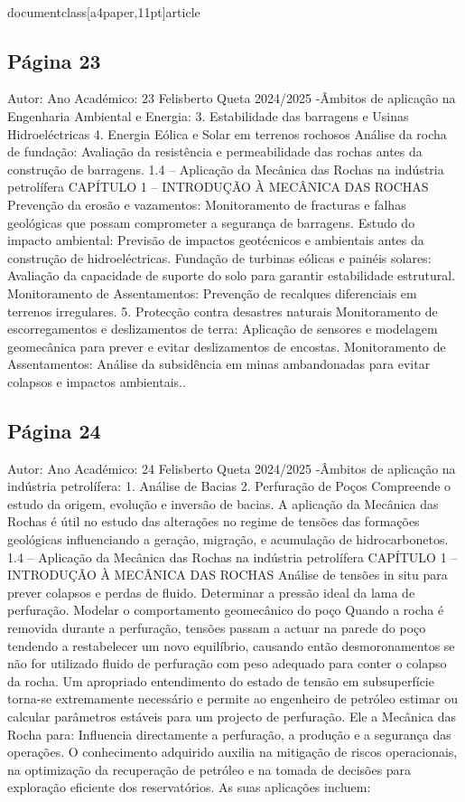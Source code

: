 \\documentclass[a4paper,11pt]{article}
\begin{document}
\subsection*{Página 23}
Autor:
Ano Académico:
23
Felisberto Queta
2024/2025
-Âmbitos de aplicação na Engenharia Ambiental e Energia:
3. Estabilidade das barragens e Usinas Hidroeléctricas
4. Energia Eólica e Solar em terrenos rochosos
Análise da rocha de fundação:
Avaliação da resistência e permeabilidade das rochas antes da construção de barragens.
1.4 – Aplicação da Mecânica das Rochas na indústria petrolífera
CAPÍTULO 1 – INTRODUÇÃO À MECÂNICA DAS ROCHAS
Prevenção da erosão e vazamentos:
Monitoramento de fracturas e falhas geológicas que possam comprometer a segurança de barragens.
Estudo do impacto ambiental:
Previsão de impactos geotécnicos e ambientais antes da construção de hidroeléctricas.
Fundação de turbinas eólicas e painéis solares:
Avaliação da capacidade de suporte do solo para garantir estabilidade estrutural.
Monitoramento de Assentamentos:
Prevenção de recalques diferenciais em terrenos irregulares.
5. Protecção contra desastres naturais
Monitoramento de escorregamentos e deslizamentos de terra:
Aplicação de sensores e modelagem geomecânica para prever e evitar deslizamentos de encostas.
Monitoramento de Assentamentos:
Análise da subsidência em minas ambandonadas para evitar colapsos e impactos ambientais..



\subsection*{Página 24}
Autor:
Ano Académico:
24
Felisberto Queta
2024/2025
-Âmbitos de aplicação na indústria petrolífera:
1. Análise de Bacias
2. Perfuração de Poços
Compreende o estudo da origem, evolução e inversão de bacias. A aplicação da Mecânica das Rochas é útil no estudo das
alterações no regime de tensões das formações geológicas influenciando a geração, migração, e acumulação de
hidrocarbonetos.
1.4 – Aplicação da Mecânica das Rochas na indústria petrolífera
CAPÍTULO 1 – INTRODUÇÃO À MECÂNICA DAS ROCHAS
Análise de tensões in situ para prever colapsos e perdas de fluido.
Determinar a pressão ideal da lama de perfuração.
Modelar o comportamento geomecânico do poço
Quando a rocha é removida durante a perfuração, tensões passam a actuar na parede do poço tendendo a restabelecer um 
novo equilíbrio, causando então desmoronamentos se não for utilizado fluido de perfuração com peso adequado para conter 
o colapso da rocha. Um apropriado entendimento do estado de tensão em subsuperfície torna-se extremamente necessário 
e permite ao engenheiro de petróleo estimar ou calcular parâmetros estáveis para um projecto de perfuração. Ele a 
Mecânica das Rocha para:
Influencia directamente a perfuração, a produção e a segurança das operações. O conhecimento adquirido auxilia
na mitigação de riscos operacionais, na optimização da recuperação de petróleo e na tomada de decisões para
exploração eficiente dos reservatórios. As suas aplicações incluem:
\end{document}
